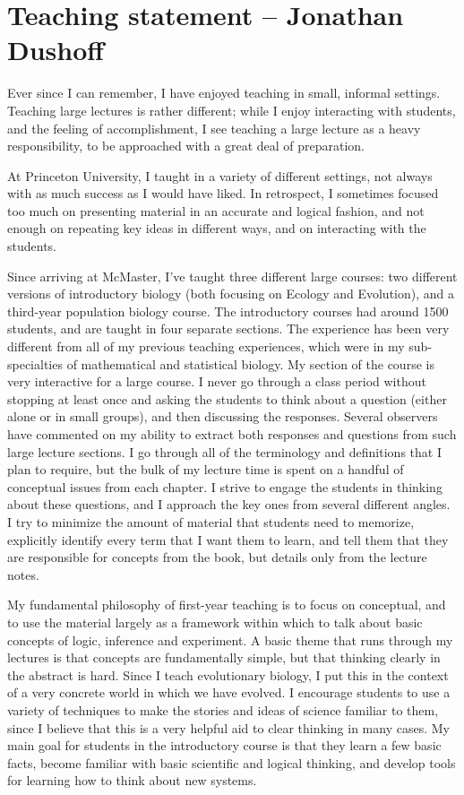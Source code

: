 \documentclass[12pt]{article}
\begin{document}
\section*{Teaching statement -- Jonathan Dushoff }

Ever since I can remember, I have enjoyed teaching in small, informal settings.  Teaching large lectures is rather different; while I enjoy interacting with students, and the feeling of accomplishment, I see teaching a large lecture as a heavy responsibility, to be approached with a great deal of preparation.

At Princeton University, I taught in a variety of different settings, not always with as much success as I would have liked.  In retrospect, I sometimes focused too much on presenting material in an accurate and logical fashion, and not enough on repeating key ideas in different ways, and on interacting with the students.

Since arriving at McMaster, I've taught three different large courses: two different versions of introductory biology (both focusing on Ecology and Evolution), and a third-year population biology course.  The introductory courses had around 1500 students, and are taught in four separate sections.  The experience has been very different from all of my previous teaching experiences, which were in my sub-specialties of mathematical and statistical biology.  
My section of the course is very interactive for a large course.
I never go through a class period without stopping at least once and asking the students to think about a question (either alone or in small groups), and then discussing the responses.
Several observers have commented on my ability to extract both responses and questions from such large lecture sections.
I go through all of the terminology and definitions that I plan to require, but the bulk of my lecture time is spent on a handful of conceptual issues from each chapter.
I strive to engage the students in thinking about these questions, and I approach the key ones from several different angles.
I try to minimize the amount of material that students need to memorize, explicitly identify every term that I want them to learn, and tell them that they are responsible for concepts from the book, but details only from the lecture notes.

My fundamental philosophy of first-year teaching is to focus on conceptual, and to use the material largely as a framework within which to talk about basic concepts of logic, inference and experiment.  A basic theme that runs through my lectures is that concepts are fundamentally simple, but that thinking clearly in the abstract is hard.  Since I teach evolutionary biology, I put this in the context of a very concrete world in which we have evolved.  I encourage students to use a variety of techniques to make the stories and ideas of science familiar to them, since I believe that this is a very helpful aid to clear thinking in many cases.  My main goal for students in the introductory course is that they learn a few basic facts, become familiar with basic scientific and logical thinking, and develop tools for learning how to think about new systems.
\end{document}
